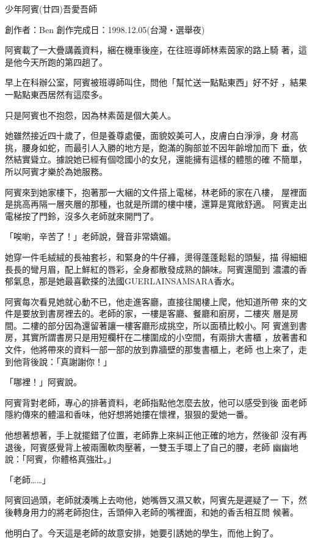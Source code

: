



少年阿賓(廿四)吾愛吾師

創作者：Ben
創作完成日：1998.12.05(台灣‧選舉夜)


阿賓載了一大疊講義資料，綑在機車後座，在往班導師林素茵家的路上騎
著，這是他今天所跑的第四趟了。

早上在科辦公室，阿賓被班導師叫住，問他「幫忙送一點點東西」好不好
，結果一點點東西居然有這麼多。

只是阿賓也不抱怨，因為林素茵是個大美人。

她雖然接近四十歲了，但是養尊處優，面貌姣美可人，皮膚白白淨淨，身
材高挑，腰身如蛇，而最引人入勝的地方是，飽滿的胸部並不因年齡增加而下
垂，依然結實聳立。據說她已經有個唸國小的女兒，還能擁有這樣的體態的確
不簡單，所以阿賓才樂於為她服務。

阿賓來到她家樓下，抱著那一大綑的文件搭上電梯，林老師的家在八樓，
屋裡面是挑高再隔一層夾層的那種，也就是所謂的樓中樓，還算是寬敞舒適。
阿賓走出電梯按了門鈴，沒多久老師就來開門了。

「唉喲，辛苦了！」老師說，聲音非常嬌媚。

她穿一件毛絨絨的長袖套衫，和緊身的牛仔褲，燙得蓬蓬鬆鬆的頭髮，描
得細細長長的彎月眉，配上鮮紅的唇彩，全身都散發成熟的韻味。阿賓還聞到
濃濃的香郁氣息，那是她最喜歡搽的法國GUERLAINSAMSARA香水。

阿賓每次看見她就心動不已，他走進客廳，直接往閣樓上爬，他知道所帶
來的文件是要放到書房裡去的。老師的家，一樓是客廳、餐廳和廚房，二樓夾
層是房間。二樓的部分因為還留著讓一樓客廳形成挑空，所以面積比較小。阿
賓進到書房，其實所謂書房只是用短欄杆在二樓圍成的小空間，有兩排大書櫃
，放著書和文件，他將帶來的資料一部一部的放到靠牆壁的那隻書櫃上，老師
也上來了，走到他背後說：「真謝謝你！」

「哪裡！」阿賓說。

阿賓背對老師，專心的排著資料，老師指點他怎麼去放，他可以感受到後
面老師隱約傳來的體溫和香味，他好想將她摟在懷裡，狠狠的愛她一番。

他想著想著，手上就擺錯了位置，老師靠上來糾正他正確的地方，然後卻
沒有再退後，阿賓感覺背上被兩團軟肉壓著，一雙玉手環上了自己的腰，老師
幽幽地說：「阿賓，你體格真強壯。」

「老師……」

阿賓回過頭，老師就湊嘴上去吻他，她嘴唇又濕又軟，阿賓先是遲疑了一
下，然後轉身用力的將老師抱住，舌頭伸入老師的嘴裡面，和她的香舌相互問
候著。

他明白了。今天這是老師的故意安排，她要引誘她的學生，而他上鉤了。

